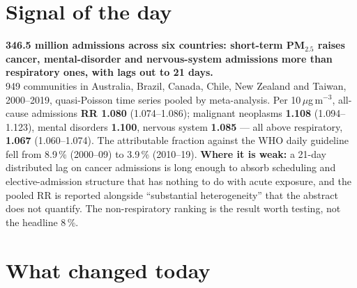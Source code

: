 \documentclass[10pt]{article}
\begin{document}
\vspace{6mm}

\section*{\sffamily\bfseries\color{Deep}Signal of the day}
\vspace{-1.5mm}{\color{Amber}\rule{\linewidth}{1.1pt}}\vspace{2.5mm}

\begin{keybox}
{\sffamily\bfseries\small\color{Deep}346.5 million admissions across six countries: short-term
PM$_{2.5}$ raises cancer, mental-disorder and nervous-system admissions more than respiratory ones, with lags
out to 21 days.}\\[1.4mm]
\footnotesize
949 communities in Australia, Brazil, Canada, Chile, New Zealand and Taiwan, 2000--2019, quasi-Poisson time
series pooled by meta-analysis. Per 10\,$\mu$g\,m$^{-3}$, all-cause admissions \textbf{RR 1.080} (1.074--1.086);
malignant neoplasms \textbf{1.108} (1.094--1.123), mental disorders \textbf{1.100}, nervous system \textbf{1.085}
--- all above respiratory, \textbf{1.067} (1.060--1.074). The attributable fraction against the WHO daily
guideline fell from 8.9\,\% (2000--09) to 3.9\,\% (2010--19).
\textbf{Where it is weak:} a 21-day distributed lag on cancer admissions is long enough to absorb scheduling
and elective-admission structure that has nothing to do with acute exposure, and the pooled RR is reported
alongside ``substantial heterogeneity'' that the abstract does not quantify. The non-respiratory ranking is
the result worth testing, not the headline 8\,\%.\par
\end{keybox}

\vspace{3mm}

\section*{\sffamily\bfseries\color{Deep}What changed today}
\vspace{-1.5mm}{\color{Amber}\rule{\linewidth}{1.1pt}}\vspace{2.5mm}
\end{document}

